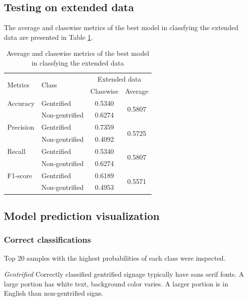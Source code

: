 \subsection{Testing on extended data}
The average and classwise metrics of the best model in classfying the extended data are presented in Table \ref{fig:resnet50_pano}.

\begin{table}[h]
\begin{tabular}{llcc}
\multirow{2}{*}{Metrics}   & \multirow{2}{*}{Class} & \multicolumn{2}{c}{Extended data}   \\ \cline{3-4} 
                           &                        & Classwise & Average                 \\ \hline
Accuracy                   & Gentrified             & 0.5340    & \multirow{2}{*}{0.5807} \\
                           & Non-gentrified         & 0.6274    &                         \\
Precision                  & Gentrified             & 0.7359    & \multirow{2}{*}{0.5725} \\
                           & Non-gentrified         & 0.4092    &                         \\
Recall                     & Gentrified             & 0.5340    & \multirow{2}{*}{0.5807} \\
                           & Non-gentrified         & 0.6274    &                         \\
F1-score                   & Gentrified             & 0.6189    & \multirow{2}{*}{0.5571} \\
                           & Non-gentrified         & 0.4953    &                        
\end{tabular}
\caption{Average and classwise metrics of the best model in classfying the extended data}
\label{fig:resnet50_pano}
\end{table}

\subsection{Model prediction visualization}
\subsubsection{Correct classifications}
Top 20 samples with the highest probabilities of each class were inspected.

\textit{Gentrified} Correctly classified gentrified signage typically have sans serif fonts. A large portion has white text, background color varies. A larger portion is in English than non-gentrified signs.

